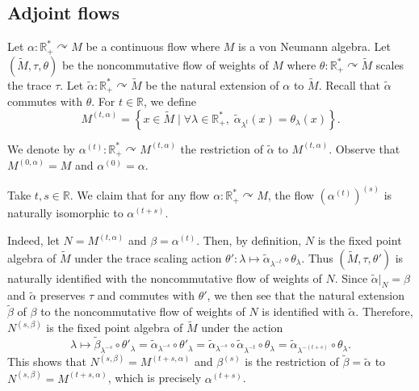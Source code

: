 \documentclass[a4paper,11pt]{amsart}
\numberwithin{equation}{section}
\theoremstyle{definition}
\newcommand{\R}{\mathbb{R}}
\begin{document}
\subsection{Adjoint flows}
Let $\alpha : \R^*_+ \curvearrowright M$ be a continuous flow where $M$ is a von Neumann algebra. Let $(\widetilde{M},\tau,\theta)$ be the noncommutative flow of weights of $M$ where $\theta : \R^*_+ \curvearrowright \widetilde{M}$ scales the trace $\tau$. Let $\widetilde{\alpha} : \R^*_+ \curvearrowright \widetilde{M}$ be the natural extension of $\alpha$ to $\widetilde{M}$. Recall that $\widetilde{\alpha}$ commutes with $\theta$. For $t \in \R$, we define 
$$ M^{(t, \alpha)}=\left\{ x \in \widetilde{M} \mid \forall \lambda \in \R^*_+, \; \widetilde{\alpha}_{\lambda^t}(x )=\theta_\lambda(x) \right\}.$$


We denote by $\alpha^{(t)} : \R^*_+ \curvearrowright M^{(t,\alpha)}$ the restriction of $\widetilde{\alpha}$ to $M^{(t,\alpha)}$. Observe that $M^{(0,\alpha)}=M$ and $\alpha^{(0)}=\alpha$.

Take $t,s \in \R$. We claim that for any flow $\alpha : \R^*_+ \curvearrowright M$, the flow $(\alpha^{(t)})^{(s)}$ is naturally isomorphic to $\alpha^{(t+s)}$.

Indeed, let $N=M^{(t,\alpha)}$ and $\beta = \alpha^{(t)}$. Then, by definition, $N$ is the fixed point algebra of $\widetilde{M}$ under the trace scaling action $\theta' : \lambda \mapsto \widetilde{\alpha}_{\lambda^{-t}}\circ \theta_\lambda$. Thus $(\widetilde{M},\tau,\theta')$ is naturally identified with the noncommutative flow of weights of $N$. Since $\widetilde{\alpha}|_N = \beta$ and $\widetilde{\alpha}$ preserves $\tau$ and commutes with $\theta'$, we then see that the natural extension $\widetilde{\beta}$ of $\beta$ to the noncommutative flow of weights of $N$ is identified with $\widetilde{\alpha}$. Therefore, $N^{(s,\beta)}$ is the fixed point algebra of $\widetilde{M}$ under the action 
$$\lambda \mapsto \widetilde{\beta}_{\lambda^{-s}} \circ \theta'_\lambda=\widetilde{\alpha}_{\lambda^{-s}} \circ \theta'_\lambda = \widetilde{\alpha}_{\lambda^{-s}} \circ \widetilde{\alpha}_{\lambda^{-t}}\circ \theta_\lambda = \widetilde{\alpha}_{\lambda^{-(t+s)}}\circ \theta_\lambda.$$
This shows that $N^{(s,\beta)}=M^{(t+s,\alpha)}$ and $\beta^{(s)}$ is the restriction of $\widetilde{\beta}=\widetilde{\alpha}$ to $N^{(s,\beta)}=M^{(t+s,\alpha)}$, which is precisely $\alpha^{(t+s)}$.
\end{document}
